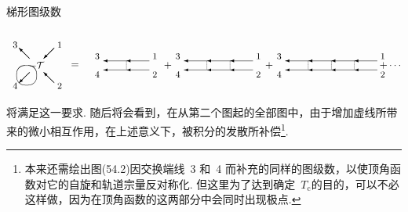 梯形图级数
\begin{equation}
\setlength{\unitlength}{0.75pt}%
\begin{picture}(512,88)(0,0)
  \put(25,23){\oval(26,26)}
  \put(38,36){\makebox(0,0){\small$-\mathcal{T}$}}
  \put(29,45){\vector(-1,1){14}}
  \put(10,63){\makebox(0,0){\small$3$}}
  \put(61,59){\vector(-1,-1){14}}
  \put(68,63){\makebox(0,0){\small$1$}}
  \put(29,27){\vector(-1,-1){14}}
  \put(10,9){\makebox(0,0){\small$4$}}
  \put(61,13){\vector(-1,1){14}}
  \put(68,9){\makebox(0,0){\small$2$}}
  \put(88,36){\makebox(0,0){$=$}}
  \put(117,48){\makebox(0,0){\small$3$}}
  \put(155,42){\vector(-1,0){30}}
  \put(185,42){\vector(-1,0){30}}
  \put(192,48){\makebox(0,0){\small$1$}}
  \multiput(155,42)(0,-2){6}{\line(0,-1){1}}
  \put(117,24){\makebox(0,0){\small$4$}}
  \put(155,30){\vector(-1,0){30}}
  \put(185,30){\vector(-1,0){30}}
  \put(192,24){\makebox(0,0){\small$2$}}
  \put(209,36){\makebox(0,0){$+$}}
  \put(222,48){\makebox(0,0){\small$3$}}
  \put(260,42){\vector(-1,0){30}}
  \put(290,42){\vector(-1,0){30}}
  \put(320,42){\vector(-1,0){30}}
  \put(327,48){\makebox(0,0){\small$1$}}
  \multiput(260,42)(0,-2){6}{\line(0,-1){1}}
  \multiput(290,42)(0,-2){6}{\line(0,-1){1}}
  \put(222,24){\makebox(0,0){\small$4$}}
  \put(260,30){\vector(-1,0){30}}
  \put(290,30){\vector(-1,0){30}}
  \put(320,30){\vector(-1,0){30}}
  \put(327,24){\makebox(0,0){\small$2$}}
  \put(341,36){\makebox(0,0){$+$}}
  \put(354,48){\makebox(0,0){\small$3$}}
  \put(392,42){\vector(-1,0){30}}
  \put(422,42){\vector(-1,0){30}}
  \put(452,42){\vector(-1,0){30}}
  \put(482,42){\vector(-1,0){30}}
  \put(489,48){\makebox(0,0){\small$1$}}
  \multiput(392,42)(0,-2){6}{\line(0,-1){1}}
  \multiput(422,42)(0,-2){6}{\line(0,-1){1}}
  \multiput(452,42)(0,-2){6}{\line(0,-1){1}}
  \put(354,24){\makebox(0,0){\small$4$}}
  \put(392,30){\vector(-1,0){30}}
  \put(422,30){\vector(-1,0){30}}
  \put(452,30){\vector(-1,0){30}}
  \put(482,30){\vector(-1,0){30}}
  \put(489,24){\makebox(0,0){\small$2$}}
  \put(500,36){\makebox(0,0){$+\cdots$}}
\end{picture}
\end{equation}
将满足这一要求. 随后将会看到，在从第二个图起的全部图中，由于增加虚线所带来的微小相互作用，在上述意义下，被积分的发散所补偿\footnote{本来还需绘出图(54.2)因交换端线~3 和~4 而补充的同样的图级数，以使顶角函数对它的自旋和轨道宗量反对称化. 但这里为了达到确定~$T_{\mathrm{c}}$的目的，可以不必这样做，因为在顶角函数的这两部分中会同时出现极点.}.

